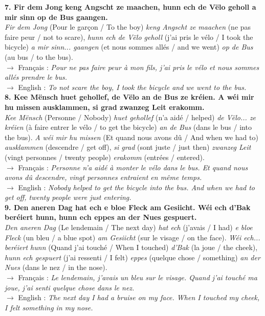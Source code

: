\noindent\textbf{7. Fir dem Jong keng Angscht ze maachen, hunn ech de Vëlo geholl a mir sinn op de Bus gaangen.}\\
\textit{Fir dem Jong} (Pour le garçon / To the boy) \textit{keng Angscht ze maachen} (ne pas faire peur / not to scare), \textit{hunn ech de Vëlo geholl} (j'ai pris le vélo / I took the bicycle) \textit{a mir sinn... gaangen} (et nous sommes allés / and we went) \textit{op de Bus} (au bus / to the bus).\\
$\rightarrow$ Français : \textit{Pour ne pas faire peur à mon fils, j'ai pris le vélo et nous sommes allés prendre le bus.}\\
$\rightarrow$ English : \textit{To not scare the boy, I took the bicycle and we went to the bus.}\\[0.5em]

\noindent\textbf{8. Kee Mënsch huet gehollef, de Vëlo an de Bus ze kréien. A wéi mir hu missen ausklammen, si grad zwanzeg Leit erakomm.}\\
\textit{Kee Mënsch} (Personne / Nobody) \textit{huet gehollef} (n'a aidé / helped) \textit{de Vëlo... ze kréien} (à faire entrer le vélo / to get the bicycle) \textit{an de Bus} (dans le bus / into the bus). \textit{A wéi mir hu missen} (Et quand nous avons dû / And when we had to) \textit{ausklammen} (descendre / get off), \textit{si grad} (sont juste / just then) \textit{zwanzeg Leit} (vingt personnes / twenty people) \textit{erakomm} (entrées / entered).\\
$\rightarrow$ Français : \textit{Personne n'a aidé à monter le vélo dans le bus. Et quand nous avons dû descendre, vingt personnes entraient en même temps.}\\
$\rightarrow$ English : \textit{Nobody helped to get the bicycle into the bus. And when we had to get off, twenty people were just entering.}\\[0.5em]

\noindent\textbf{9. Den aneren Dag hat ech e bloe Fleck am Gesiicht. Wéi ech d'Bak beréiert hunn, hunn ech eppes an der Nues gespuert.}\\
\textit{Den aneren Dag} (Le lendemain / The next day) \textit{hat ech} (j'avais / I had) \textit{e bloe Fleck} (un bleu / a blue spot) \textit{am Gesiicht} (sur le visage / on the face). \textit{Wéi ech... beréiert hunn} (Quand j'ai touché / When I touched) \textit{d'Bak} (la joue / the cheek), \textit{hunn ech gespuert} (j'ai ressenti / I felt) \textit{eppes} (quelque chose / something) \textit{an der Nues} (dans le nez / in the nose).\\
$\rightarrow$ Français : \textit{Le lendemain, j'avais un bleu sur le visage. Quand j'ai touché ma joue, j'ai senti quelque chose dans le nez.}\\
$\rightarrow$ English : \textit{The next day I had a bruise on my face. When I touched my cheek, I felt something in my nose.}\\[0.5em]

